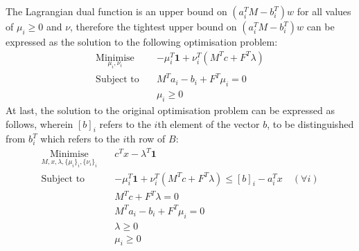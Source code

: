 The Lagrangian dual function is an upper bound on $(a_i^TM - b_i^T)w$ for all values of $\mu_i \ge 0$ and $\nu$, therefore the tightest upper bound on $(a_i^TM - b_i^T)w$ can be expressed as the solution to the following optimisation problem:
\begin{align*}
    \underset{\mu_i, \nu_i}{\text{Minimise}} \quad & -\mu_i^T \mathbf{1} + \nu_i^T(M^Tc + F^T\lambda) \\
    \text{Subject to} \quad & M^Ta_i - b_i + F^T\mu_i = 0 \\
    & \mu_i \ge 0
\end{align*}
At last, the solution to the original optimisation problem can be expressed as follows, wherein $[b]_i$ refers to the $i$th element of the vector $b$, to be distinguished from $b_i^T$ which refers to the $i$th row of $B$:
\begin{align*}
    \underset{M, x, \lambda, \{\mu_i\}_i, \{\nu_i\}_i}{\text{Minimise}} \quad & c^Tx - \lambda^T\mathbf{1} \\
    \text{Subject to} \quad & -\mu_i^T \mathbf{1} + \nu_i^T(M^Tc + F^T\lambda) \le [b]_i - a_i^Tx \quad (\forall i) \\
    & M^Tc + F^T\lambda = 0 \\
    & M^Ta_i - b_i + F^T\mu_i = 0 \\
    & \lambda \ge 0 \\
    & \mu_i \ge 0
\end{align*}
